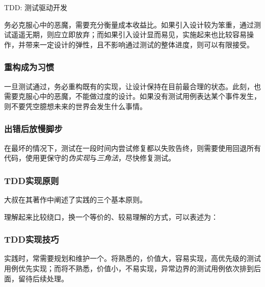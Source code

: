 \begin{content}
\begin{episode}{TDD: 测试驱动开发}
\begin{content}
务必克服心中的恶魔，需要充分衡量成本收益比。如果引入设计较为笨重，通过测试遥遥无期，则应立即放弃；而如果引入设计显而易见，实施起来也比较容易操作，并带来一定设计的弹性，且不影响通过测试的整体进度，则可以有限接受。

\subsubsection{重构成为习惯}

一旦测试通过，务必重构既有的实现，让设计保持在目前最合理的状态。此刻，也需要克服心中的恶魔，不能做过度的设计。如果没有测试用例表达某个事件发生，则不要凭空臆想未来的世界会发生什么事情。

\subsubsection{出错后放慢脚步}

在最坏的情况下，测试在一段时间内尝试修复都以失败告终，则需要使用回退所有代码，使用更保守的\emph{伪实现}与\emph{三角法}，尽快修复测试。

\subsubsection{TDD实现原则}

大叔在其著作中阐述了实践的三个基本原则。

\begin{enum}
\end{enum}

理解起来比较绕口，换一个等价的、较易理解的方式，可以表述为：

\begin{enum}
\end{enum}

\subsubsection{TDD实现技巧}

实践时，常需要规划和维护一个。将熟悉的，价值大，容易实现，高优先级的测试用例优先实现；而将不熟悉，价值小，不易实现，异常边界的测试用例依次排到后面，留待后续处理。

\begin{enum}
\end{enum}


\end{content}
\end{episode}
\end{content}
